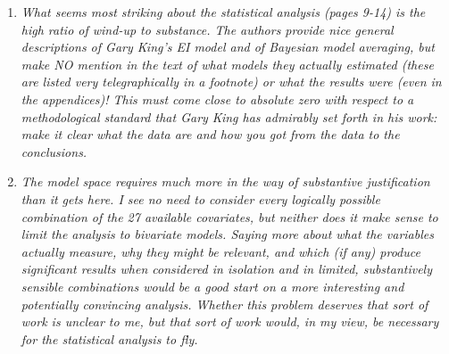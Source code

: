 \documentclass[11pt]{article}
\begin{document}
\begin{enumerate}
\item {\it What seems most striking about the statistical analysis (pages
  9-14) is the high ratio of wind-up to substance.  The authors
  provide nice general descriptions of Gary King's EI model and of
  Bayesian model averaging, but make NO mention in the text of what
  models they actually estimated (these are listed very
  telegraphically in a footnote) or what the results were (even in the
  appendices)!  This must come close to absolute zero with respect to
  a methodological standard that Gary King has admirably set forth in
  his work: make it clear what the data are and how you got from the
  data to the conclusions.}

\item {\it The model space requires much more in the way of
    substantive justification than it gets here.  I see no need to
    consider every logically possible combination of the 27 available
    covariates, but neither does it make sense to limit the analysis
    to bivariate models.  Saying more about what the variables
    actually measure, why they might be relevant, and which (if any)
    produce significant results when considered in isolation and in
    limited, substantively sensible combinations would be a good start
    on a more interesting and potentially convincing analysis.
    Whether this problem deserves that sort of work is unclear to me,
    but that sort of work would, in my view, be necessary for the
    statistical analysis to fly.}
 


 


\end{enumerate}
\end{document}

